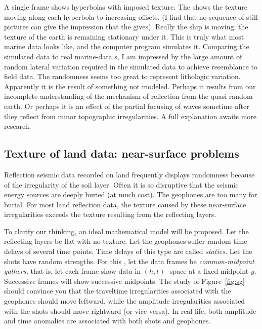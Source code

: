 
\par
A single frame shows hyperbolas with imposed texture.
The  shows the texture
moving along each hyperbola to increasing offsets.
(I find that no sequence of still pictures can
give the impression that the  gives).
Really the ship is moving; the texture of
the earth is remaining stationary under it.
This is truly what most marine data looks like,
and the computer program simulates it.
Comparing the simulated data to real marine-data s,
I am impressed by the large amount of random lateral variation required
in the simulated data to achieve resemblance to field data.
The randomness seems too great to represent lithologic variation.
Apparently it is the result of something not modeled.
Perhaps it results from our incomplete understanding of the
mechanism of reflection from the quasi-random earth.
Or perhaps it is an effect of the 
partial focusing of waves sometime after they
reflect from minor topographic irregularities.
A full explanation awaits more research.


\subsection{Texture of land data: near-surface problems}
\par
Reflection seismic data recorded on land frequently displays randomness
because of the irregularity of the soil layer.
Often it is so disruptive that the seismic energy sources are
deeply buried (at much cost).
The geophones are too many for burial.
For most land reflection data, the texture caused by these near-surface
irregularities exceeds the texture resulting from the reflecting layers.
\par
To clarify our thinking, an ideal mathematical model will be proposed.
Let the reflecting layers be flat with no texture.
Let the geophones suffer random time delays of several time points.
Time delays of this type are called
{\em statics.}
Let the shots have random strengths.
For this , let the data frames be
{\em 
common-midpoint gathers,
}
that is, let each frame show data in  $(h,t)$
-space at a fixed midpoint  $y$.
Successive frames will show successive midpoints.
The study of Figure~\ref{fig:sg} should convince you that the
traveltime irregularities associated with the geophones should
move leftward, while the amplitude irregularities associated with
the shots  should move rightward (or vice versa).
In real life, both amplitude and time anomalies are associated
with both shots and geophones.

